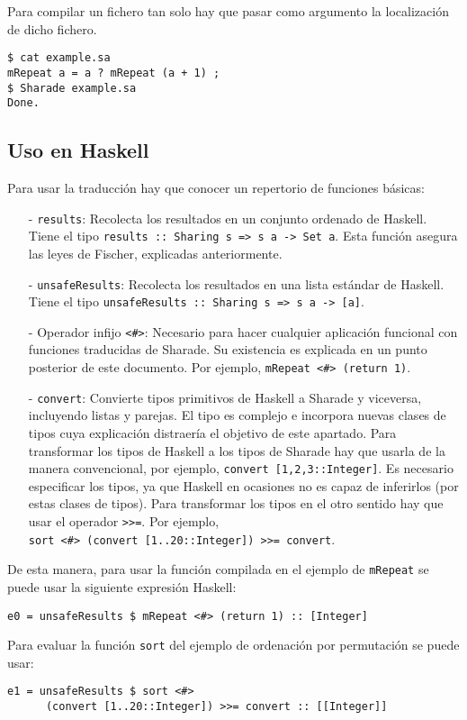 \documentclass[class=article, crop=false]{standalone}
\begin{document}
Para compilar un fichero tan solo hay que pasar como argumento la localización de dicho
fichero.

\begin{verbatim}
$ cat example.sa
mRepeat a = a ? mRepeat (a + 1) ;
$ Sharade example.sa
Done.
\end{verbatim}

\subsection{Uso en Haskell}

Para usar la traducción hay que conocer un repertorio de funciones básicas:

\begin{itemize}
  \item[-] \verb`results`: Recolecta los resultados en un conjunto ordenado de Haskell. Tiene
  el tipo \verb`results :: Sharing s => s a -> Set a`. Esta función asegura las leyes de
  Fischer, explicadas anteriormente.
  
  \item[-] \verb`unsafeResults`: Recolecta los resultados en una lista estándar de Haskell.
  Tiene el tipo \verb`unsafeResults :: Sharing s => s a -> [a]`.
  
  \item[-] Operador infijo \verb`<#>`: Necesario para hacer cualquier aplicación funcional
  con funciones traducidas de Sharade. Su existencia es explicada en un punto posterior de
  este documento. Por ejemplo, \verb`mRepeat <#> (return 1)`.
  
  \item[-] \verb`convert`: Convierte tipos primitivos de Haskell a Sharade y viceversa,
  incluyendo listas y parejas. El tipo es complejo e incorpora nuevas clases de tipos cuya
  explicación distraería el objetivo de este apartado. Para transformar los tipos de Haskell
  a los tipos de Sharade hay que usarla de la manera convencional, por ejemplo,
  \verb`convert [1,2,3::Integer]`. Es necesario especificar los tipos, ya que Haskell en
  ocasiones no es capaz de inferirlos (por estas clases de tipos). Para transformar los tipos
  en el otro sentido hay que usar el operador \verb`>>=`. Por ejemplo, \\
  \verb`sort <#> (convert [1..20::Integer]) >>= convert`.
\end{itemize}

De esta manera, para usar la función compilada en el ejemplo de \verb`mRepeat` se puede usar
la siguiente expresión Haskell:

\begin{verbatim}
e0 = unsafeResults $ mRepeat <#> (return 1) :: [Integer]
\end{verbatim}

Para evaluar la función \verb`sort` del ejemplo de ordenación por permutación se puede usar:

\begin{verbatim}
e1 = unsafeResults $ sort <#>
      (convert [1..20::Integer]) >>= convert :: [[Integer]]
\end{verbatim}
\end{document}
